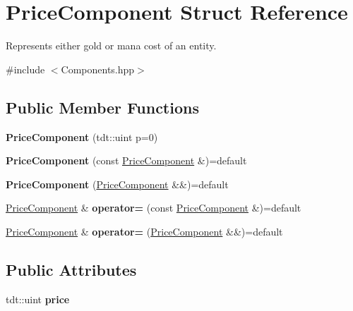 \hypertarget{struct_price_component}{}\section{Price\+Component Struct Reference}
\label{struct_price_component}


Represents either gold or mana cost of an entity.  




{\ttfamily \#include $<$Components.\+hpp$>$}

\subsection*{Public Member Functions}
\begin{DoxyCompactItemize}
\item 
{\bfseries Price\+Component} (tdt\+::uint p=0)\hypertarget{struct_price_component_a46bf31ddd3c5eb3570a14a8f0d9d64eb}{}\label{struct_price_component_a46bf31ddd3c5eb3570a14a8f0d9d64eb}

\item 
{\bfseries Price\+Component} (const \hyperlink{struct_price_component}{Price\+Component} \&)=default\hypertarget{struct_price_component_a2c5d8e7a536cd3549cce05553af77f42}{}\label{struct_price_component_a2c5d8e7a536cd3549cce05553af77f42}

\item 
{\bfseries Price\+Component} (\hyperlink{struct_price_component}{Price\+Component} \&\&)=default\hypertarget{struct_price_component_a6d90e1366e588476e431fc97c214c493}{}\label{struct_price_component_a6d90e1366e588476e431fc97c214c493}

\item 
\hyperlink{struct_price_component}{Price\+Component} \& {\bfseries operator=} (const \hyperlink{struct_price_component}{Price\+Component} \&)=default\hypertarget{struct_price_component_a068427317c564a177fe20089f85c26e0}{}\label{struct_price_component_a068427317c564a177fe20089f85c26e0}

\item 
\hyperlink{struct_price_component}{Price\+Component} \& {\bfseries operator=} (\hyperlink{struct_price_component}{Price\+Component} \&\&)=default\hypertarget{struct_price_component_a5b0a8b4a512c21bef557da7640d5ca77}{}\label{struct_price_component_a5b0a8b4a512c21bef557da7640d5ca77}

\end{DoxyCompactItemize}
\subsection*{Public Attributes}
\begin{DoxyCompactItemize}
\item 
tdt\+::uint {\bfseries price}\hypertarget{struct_price_component_a05bed34eebceb5eb22a36ee130bf7c3b}{}\label{struct_price_component_a05bed34eebceb5eb22a36ee130bf7c3b}

\end{DoxyCompactItemize}
